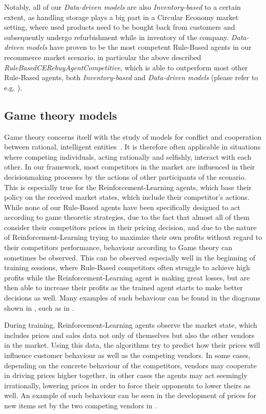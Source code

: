 Notably, all of our \emph{Data-driven models} are also \emph{Inventory-based} to a certain extent, as handling storage plays a big part in a Circular Economy market setting, where used products need to be bought back from customers and subsequently undergo refurbishment while in inventory of the company. \emph{Data-driven models} have proven to be the most competent Rule-Based agents in our recommerce market scenario, in particular the above described \emph{RuleBasedCERebuyAgentCompetitive}, which is able to outperform most other Rule-Based agents, both \emph{Inventory-based} and \emph{Data-driven models} (please refer to e.g. ).

\subsection*{Game theory models}\label{subsec:GameTheory}

Game theory concerns itself with the study of models for conflict and cooperation between rational, intelligent entities~\cite{GameTheory}. It is therefore often applicable in situations where competing individuals, acting rationally and selfishly, interact with each other. In our framework, most competitors in the market are influenced in their decisionmaking processes by the actions of other participants of the scenario. This is especially true for the Reinforcement-Learning agents, which base their policy on the received market states, which include their competitor's actions. While none of our Rule-Based agents have been specifically designed to act according to game theoretic strategies, due to the fact that almost all of them consider their competitors prices in their pricing decision, and due to the nature of Reinforcement-Learning trying to maximize their own profits without regard to their competitors performance, behaviour according to Game theory can sometimes be observed. This can be observed especially well in the beginning of training sessions, where Rule-Based competitors often struggle to achieve high profits while the Reinforcement-Learning agent is making great losses, but are then able to increase their profits as the trained agent starts to make better decisions as well. Many examples of such behaviour can be found in the diagrams shown in , such as in .

During training, Reinforcement-Learning agents observe the market state, which includes prices and sales data not only of themselves but also the other vendors in the market. Using this data, the algorithms try to predict how their prices will influence customer behaviour as well as the competing vendors. In some cases, depending on the concrete behaviour of the competitors, vendors may cooperate in driving prices higher together, in other cases the agents may act seemingly irrationally, lowering prices in order to force their opponents to lower theirs as well. An example of such behaviour can be seen in the development of prices for new items set by the two competing vendors in .

